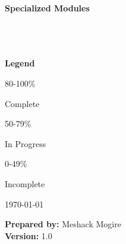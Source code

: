 \begin{titlepage}
\begin{center}
\begin{tcolorbox}[
            enhanced,
            width=0.9\textwidth,
            colback=white,
            colframe=primary!50,
            arc=0mm
        ]
\begin{center}
                \vspace{0.5cm}
                
                \begin{minipage}{0.45\textwidth}
                    \large\textbf{Specialized Modules}\\[0.2cm]
                    \\[0.2cm]
                    \\[0.2cm]
                    \\[0.2cm]
                \end{minipage}
                \hfill
                \begin{minipage}{0.45\textwidth}
                    \large\textbf{Legend}\\[0.2cm]
                    \colorbox{success!30}{\strut 80-100\%} Complete\\
                    \colorbox{warning!30}{\strut 50-79\%} In Progress\\
                    \colorbox{danger!30}{\strut 0-49\%} Incomplete
                \end{minipage}
            \end{center}
        \end{tcolorbox}
        
        \vfill
        
        \normalsize
        \today
        
        \vspace{0.5cm}
        
        \textbf{Prepared by:} Meshack Mogire\\
        \textbf{Version:} 1.0
    \end{center}
\end{titlepage}

\clearpage

